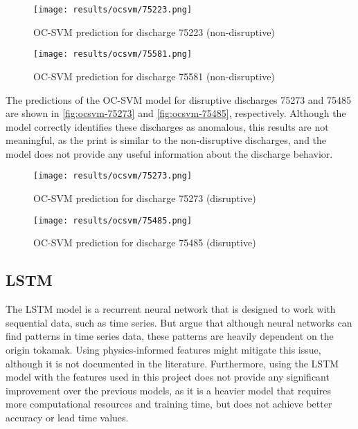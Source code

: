 \begin{figure}[H]
    \centering
    \texttt{[image: results/ocsvm/75223.png]}
    \caption{\ac{OC-SVM} prediction for discharge 75223 (non-disruptive)}
    \label{fig:ocsvm-75223}
\end{figure}

\begin{figure}[H]
    \centering
    \texttt{[image: results/ocsvm/75581.png]}
    \caption{\ac{OC-SVM} prediction for discharge 75581 (non-disruptive)}
    \label{fig:ocsvm-75581}
\end{figure}

The predictions of the \ac{OC-SVM} model for disruptive discharges 75273 and 75485 are shown in \autoref{fig:ocsvm-75273} and \autoref{fig:ocsvm-75485}, respectively. Although the model correctly identifies these discharges as anomalous, this results are not meaningful, as the print is similar to the non-disruptive discharges, and the model does not provide any useful information about the discharge behavior.

\begin{figure}[H]
    \centering
    \texttt{[image: results/ocsvm/75273.png]}
    \caption{\ac{OC-SVM} prediction for discharge 75273 (disruptive)}
    \label{fig:ocsvm-75273}
\end{figure}

\begin{figure}[H]
    \centering
    \texttt{[image: results/ocsvm/75485.png]}
    \caption{\ac{OC-SVM} prediction for discharge 75485 (disruptive)}
    \label{fig:ocsvm-75485}
\end{figure}

\subsection{\acs{LSTM}}

The \ac{LSTM} model is a recurrent neural network that is designed to work with sequential data, such as time series. But \textcite{henderChapter3MHD2007} argue that although neural networks can find patterns in time series data, these patterns are heavily dependent on the origin tokamak. Using physics-informed features might mitigate this issue, although it is not documented in the literature. Furthermore, using the \ac{LSTM} model with the features used in this project does not provide any significant improvement over the previous models, as it is a heavier model that requires more computational resources and training time, but does not achieve better accuracy or lead time values.

